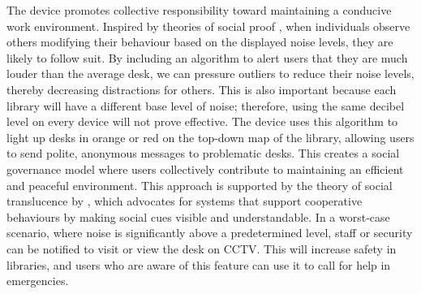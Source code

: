 \documentclass{novel}
\begin{document}
\restoregeometry

The device promotes collective responsibility toward maintaining a conducive work environment. Inspired by theories of social proof \citep{cialdini_influence_2001}, when individuals observe others modifying their behaviour based on the displayed noise levels, they are likely to follow suit. By including an algorithm to alert users that they are much louder than the average desk, we can pressure outliers to reduce their noise levels, thereby decreasing distractions for others. This is also important because each library will have a different base level of noise; therefore, using the same decibel level on every device will not prove effective. The device uses this algorithm to light up desks in orange or red on the top-down map of the library, allowing users to send polite, anonymous messages to problematic desks. This creates a social governance model where users collectively contribute to maintaining an efficient and peaceful environment. This approach is supported by the theory of social translucence by \cite{erickson_social_2000}, which advocates for systems that support cooperative behaviours by making social cues visible and understandable. In a worst-case scenario, where noise is significantly above a predetermined level, staff or security can be notified to visit or view the desk on CCTV. This will increase safety in libraries, and users who are aware of this feature can use it to call for help in emergencies.
\end{document}

